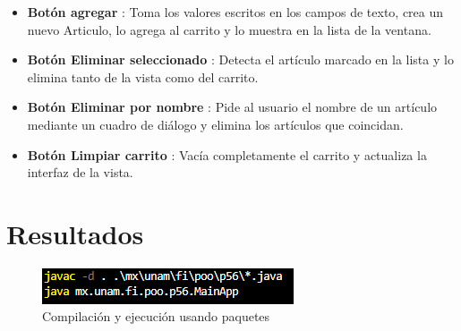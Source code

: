 \documentclass[letterpaper,12pt]{article}
\begin{document}
\begin{itemize}
    \item \textbf{Botón agregar} : Toma los valores escritos en los campos de texto, crea un nuevo Articulo, lo agrega al carrito y lo muestra en la lista de la ventana.
    \item \textbf{Botón Eliminar seleccionado} : Detecta el artículo marcado en la lista y lo elimina tanto de la vista como del carrito.
    \item \textbf{Botón Eliminar por nombre} : Pide al usuario el nombre de un artículo mediante un cuadro de diálogo y elimina los artículos que coincidan.
    \item \textbf{Botón Limpiar carrito} : Vacía completamente el carrito y actualiza la interfaz de la vista.
\end{itemize}


\clearpage

\section{Resultados}

\begin{figure}[H]
    \centering
    \includegraphics[width=0.7\linewidth]{Imagenes/comp.png}
    \caption*{Compilación y ejecución usando paquetes}
\end{figure}
\end{document}
